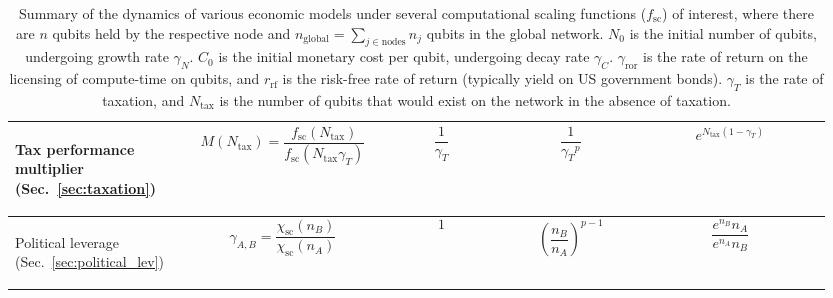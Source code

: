 \begin{table}[!htbp]
{\begin{tabular}{|m{0.21\linewidth}|m{0.21\linewidth}|m{0.15\linewidth}|m{0.155\linewidth}|m{0.225\linewidth}|}
	\hline
	\begin{flushleft}Tax performance multiplier (Sec.~\ref{sec:taxation})\end{flushleft} & \[M(N_\mathrm{tax})=\frac{f_\mathrm{sc}(N_\mathrm{tax})}{f_\mathrm{sc}(N_\mathrm{tax} \gamma_T)}\] & \[\frac{1}{\gamma_T}\] & \[\frac{1}{{\gamma_T}^p}\] & \[e^{N_\mathrm{tax}(1-\gamma_T)}\]\\
	\hline
	\begin{flushleft}Political leverage (Sec.~\ref{sec:political_lev})\end{flushleft} & \[\gamma_{A,B}=\frac{\chi_\mathrm{sc}(n_B)}{\chi_\mathrm{sc}(n_A)}\] & \[1\] & \[\left(\frac{n_B}{n_A}\right)^{p-1}\] & \[\frac{e^{n_B}n_A}{e^{n_A}n_B}\] \\
	\hline
\end{tabular}}
\captionspacetab \caption{Summary of the dynamics of various economic models under several computational scaling functions ($f_\mathrm{sc}$) of interest, where there are $n$ qubits held by the respective node and \mbox{$n_\mathrm{global}=\sum_{j\in \mathrm{nodes}} n_j$} qubits in the global network. $N_0$ is the initial number of qubits, undergoing growth rate $\gamma_N$. $C_0$ is the initial monetary cost per qubit, undergoing decay rate $\gamma_C$. $\gamma_\mathrm{ror}$ is the rate of return on the licensing of compute-time on qubits, and $r_\mathrm{rf}$ is the risk-free rate of return (typically yield on US government bonds). $\gamma_T$ is the rate of taxation, and $N_\mathrm{tax}$ is the number of qubits that would exist on the network in the absence of taxation.} \label{tab:summary_ec_models}
\end{table}

\renewcommand{\arraystretch}{1}
\startalgtable

\clearpage